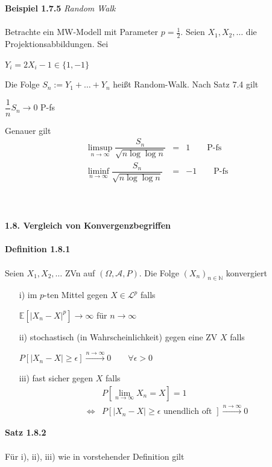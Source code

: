\documentclass[10pt,a4paper]{report}
\newcommand{\E}{\mathbb{E}}
\newcommand{\N}{\mathbb{N}}
\numberwithin{equation}{section}
\numberwithin{figure}{section}
\theoremstyle{plain}
\theoremstyle{definition}
\theoremstyle{plain}
\theoremstyle{definition}
\theoremstyle{remark}
\theoremstyle{plain}
\theoremstyle{plain}
\theoremstyle{plain}
\newcommand{\1}{ \mathbb{1} } %
\begin{document}
\textbf{Beispiel 1.7.5} \textit{Random Walk}\\\\
Betrachte ein MW-Modell mit Parameter $p=\frac{1}{2}$. Seien $X_1,X_2,\ldots$ die Projektionsabbildungen. Sei
\begin{center}
$Y_i=2X_i-1 \in \{1,-1\}$
\end{center}
Die Folge $S_n:=Y_1+\ldots+Y_n$ heißt Random-Walk. Nach Satz 7.4 gilt
\begin{center}
$\dfrac{1}{n}S_n \to 0$ P-fs
\end{center}
Genauer gilt
\begin{eqnarray*}
\limsup\limits_{n \to\infty}\dfrac{S_n}{\sqrt{n\log\log n}}&=& 1 \qquad \text{P-fs}\\
\liminf\limits_{n \to\infty}\dfrac{S_n}{\sqrt{n\log\log n}}&=& -1 \qquad \text{P-fs}
\end{eqnarray*}
\\\\\\
\Large{\textbf{1.8. Vergleich von Konvergenzbegriffen}}\normalsize\\\\
\textbf{Definition 1.8.1}\\\\
Seien $X_1,X_2,\ldots$ ZVn auf $(\Omega,\mathcal{A},P)$. Die Folge $(X_n)_{n \in \N}$ konvergiert
\begin{itemize}
\item[i)] im $p$-ten Mittel gegen $X \in \mathcal{L}^p$ falls
\begin{center}
$\E[|X_n-X|^p] \to \infty$ für $n \to \infty$
\end{center}
\item[ii)] stochastisch (in Wahrscheinlichkeit) gegen eine ZV $X$ falls
\begin{center}
$P[|X_n-X|\geq \epsilon ] \overset{n \to \infty}{\to} 0\qquad \forall \epsilon >0$
\end{center}
\item[iii)] fast sicher gegen $X$ falls
\begin{eqnarray*}
&& P\left[\lim\limits_{n \to \infty}X_n=X \right]=1\\
&\Leftrightarrow &P[|X_n-X|\geq \epsilon \text{ unendlich oft }] \overset{n \to \infty}{\to} 0
\end{eqnarray*}
\end{itemize} 
\textbf{Satz 1.8.2}\\\\
Für i), ii), iii) wie in vorstehender Definition gilt
\end{document}
